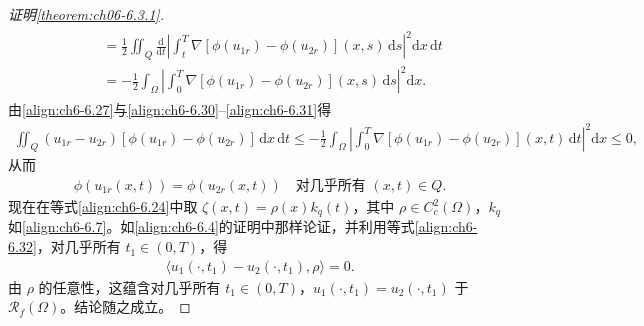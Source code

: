 \documentclass[../../main.tex]{subfiles}%
\begin{document}
\begin{proof}[证明\cref{theorem:ch06-6.3.1}]
\begin{align}
\begin{aligned}
&\quad= \frac{1}{2}\iint_Q\frac{\mathrm{d}}{\mathrm{d}t}
\left|\int_t^T\nabla[\phi(u_{1r})-\phi(u_{2r})](x,s)\,\mathrm{d}s\right|^2\mathrm{d}x\,\mathrm{d}t\\
&\quad= -\frac{1}{2}\int_\Omega\left|\int_0^T\nabla[\phi(u_{1r})-\phi(u_{2r})](x,s)\,\mathrm{d}s\right|^2\mathrm{d}x.
\end{aligned}
\label{align:ch6-6.31}
\end{align}
由\eqref{align:ch6-6.27}与\eqref{align:ch6-6.30}--\eqref{align:ch6-6.31}得
\begin{align*}
\iint_Q(u_{1r}-u_{2r})[\phi(u_{1r})-\phi(u_{2r})]\,\mathrm{d}x\,\mathrm{d}t
\leqslant-\frac{1}{2}\int_\Omega\left|\int_0^T\nabla[\phi(u_{1r})-\phi(u_{2r})](x,t)\,\mathrm{d}t\right|^2\mathrm{d}x\leqslant0,
\end{align*}
从而
\begin{align}
\phi(u_{1r}(x,t))=\phi(u_{2r}(x,t)) \quad\text{对几乎所有 }(x,t)\in Q. \label{align:ch6-6.32}
\end{align}
现在在等式\eqref{align:ch6-6.24}中取 $\zeta(x,t)=\rho(x)k_q(t)$，其中 $\rho\in C^2_c(\Omega)$，$k_q$ 如\eqref{align:ch6-6.7}。如\eqref{align:ch6-6.4}的证明中那样论证，并利用等式\eqref{align:ch6-6.32}，对几乎所有 $t_1\in(0,T)$，得
\begin{align*}
\langle u_1(\cdot,t_1)-u_2(\cdot,t_1),\rho\rangle=0.
\end{align*}
由 $\rho$ 的任意性，这蕴含对几乎所有 $t_1\in(0,T)$，$u_1(\cdot,t_1)=u_2(\cdot,t_1)$ 于 $\mathscr{R}_f(\Omega)$。结论随之成立。
\end{proof}
\end{document}
